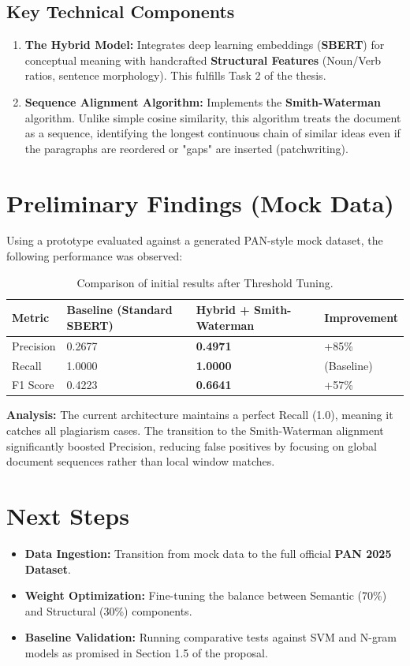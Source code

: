 \documentclass[11pt,a4paper]{article}
\begin{document}
\subsection{Key Technical Components}
\begin{enumerate}
    \item \textbf{The Hybrid Model:} Integrates deep learning embeddings (\textbf{SBERT}) for conceptual meaning with handcrafted \textbf{Structural Features} (Noun/Verb ratios, sentence morphology). This fulfills Task 2 of the thesis.
    \item \textbf{Sequence Alignment Algorithm:} Implements the \textbf{Smith-Waterman} algorithm. Unlike simple cosine similarity, this algorithm treats the document as a sequence, identifying the longest continuous chain of similar ideas even if the paragraphs are reordered or "gaps" are inserted (patchwriting).
\end{enumerate}

\section{Preliminary Findings (Mock Data)}
Using a prototype evaluated against a generated PAN-style mock dataset, the following performance was observed:

\begin{table}[h!]
\centering
\begin{tabular}{@{}llll@{}}
\toprule
Metric & Baseline (Standard SBERT) & \textbf{Hybrid + Smith-Waterman} & Improvement \\ \midrule
Precision & 0.2677 & \textbf{0.4971} & +85\% \\
Recall & 1.0000 & \textbf{1.0000} & (Baseline) \\
F1 Score & 0.4223 & \textbf{0.6641} & +57\% \\ \bottomrule
\end{tabular}
\caption{Comparison of initial results after Threshold Tuning.}
\end{table}

\textbf{Analysis:} The current architecture maintains a perfect Recall (1.0), meaning it catches all plagiarism cases. The transition to the Smith-Waterman alignment significantly boosted Precision, reducing false positives by focusing on global document sequences rather than local window matches.

\section{Next Steps}
\begin{itemize}
    \item \textbf{Data Ingestion:} Transition from mock data to the full official \textbf{PAN 2025 Dataset}.
    \item \textbf{Weight Optimization:} Fine-tuning the balance between Semantic (70\%) and Structural (30\%) components.
    \item \textbf{Baseline Validation:} Running comparative tests against SVM and N-gram models as promised in Section 1.5 of the proposal.
\end{itemize}
\end{document}
